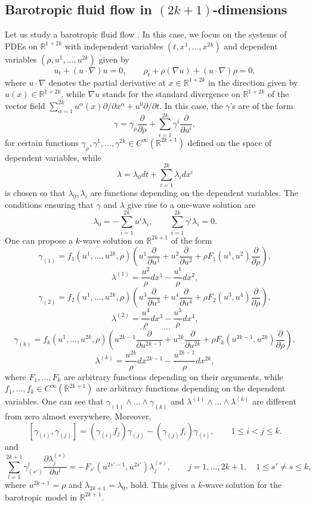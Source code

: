 \documentclass[12pt]{article}
\theoremstyle{plain}
\theoremstyle{definition}
\numberwithin{equation}{section}
\begin{document}
\subsection{Barotropic fluid flow in $(2k+1)$-dimensions}
Let us study a barotropic fluid flow \cite{Gr23,Mi58}. In this case, we focus on the systems of PDEs on $\mathbb{R}^{1+2k}$ with independent variables $(t,x^1,\ldots,x^{2k})$ and dependent variables $(\rho,u^1,\ldots,u^{2k})$ given by
$$
u_t+(u\cdot\nabla)u=0,\qquad \rho_t+\rho(\nabla u)+(u\cdot \nabla) \rho=0,
$$
where $u\cdot \nabla$ denotes the partial derivative at $x\in \mathbb{R}^{1+2k}$ in the direction given by $u(x)\in \mathbb{R}^{1+2k}$, while $\nabla u$ stands for the standard divergence on $\mathbb{R}^{1+2k}$ of the vector field $\sum_{\alpha=1}^{2k}u^\alpha(x)\partial/\partial x^\alpha+u^0\partial/\partial t$.
In this case, the $\gamma$'s are of the form
$$
\gamma=\gamma_\rho\frac{\partial}{\partial \rho}+\sum_{i=1}^{2k}\gamma^i\frac{\partial}{\partial u^i},
$$
for certain functions $\gamma_\rho,\gamma^1,\ldots,\gamma^{2k}\in C^\infty(\mathbb{R}^{2k+1})$ defined on the space of dependent variables,
while
$$
\lambda=\lambda_0dt+\sum_{i=1}^{2k}\lambda_idx^i
$$
is chosen so that $\lambda_0,\lambda_i$ are functions depending on the dependent variables. 
The conditions ensuring that $\gamma$ and $\lambda$ give rise to a one-wave solution are
$$
\lambda_0=-\sum_{i=1}^{2k}u^i\lambda_i,\qquad \sum_{i=1}^{2k}\gamma^i\lambda_i=0.
$$
One can propose a $k$-wave solution on $\mathbb{R}^{2k+1}$ of the form
$$
\gamma_{(1)}=f_1(u^1,\ldots,u^{2k},\rho) \left(u^1\frac{\partial}{\partial u^1}+u^2\frac{\partial}{\partial u^2}+\rho F_1(u^1,u^2)\frac{\partial}{\partial \rho}\right),
$$
$$
\lambda^{(1)}=\frac{u^2}{\rho}dx^1-\frac{u^1}{\rho}dx^2,
$$
$$
\gamma_{(2)}=f_2(u^1,\ldots,u^{2k},\rho) \left(u^3\frac{\partial}{\partial u^3}+u^4\frac{\partial}{\partial u^4}+\rho F_2(u^3,u^4)\frac{\partial}{\partial \rho}\right),
$$
$$
\lambda^{(2)}=\frac{u^4}{\rho}dx^3-\frac{u^3}{\rho}dx^4,
$$
$$
\ldots\qquad \ldots
$$
$$
\gamma_{(k)}=f_k(u^1,\ldots,u^{2k},\rho) \left(u^{2k-1}\frac{\partial}{\partial u^{2k-1}}+u^{2k}\frac{\partial}{\partial u^{2k}}+\rho F_k(u^{2k-1},u^{2k})\frac{\partial}{\partial \rho}\right),$$
$$
\lambda^{(k)}=\frac{u^{2k}}{\rho}dx^{2k-1}-\frac{u^{2k-1}}{\rho}dx^{2k},
$$
where $F_1,\ldots,F_k$ are arbitrary functions depending on their arguments, while $f_1,\ldots,f_k\in C^\infty(\mathbb{R}^{2k+1})$ are arbitrary functions depending on the dependent variables. One can see that $\gamma_{(1)}\wedge \ldots\wedge \gamma_{(k)}$ and $\lambda^{(1)}\wedge \ldots\wedge \lambda^{(k)}$ are different from zero almost everywhere. Moreover,
$$
[\gamma_{(i)},\gamma_{(j)}]=(\gamma_{(i)}f_j)\gamma_{(j)}-(\gamma_{(j)}f_i)\gamma_{(i)},\qquad 1\leq i<j\leq k.
$$
and 
$$
\sum_{l=1}^{2k+1}\gamma_{(s')}^l\frac{\partial \lambda^{(s)}_j}{\partial u^l}=-F_{s'}(u^{2s'-1},u^{2s'})\lambda^{(s)}_j,\qquad j=1,\ldots,2k+1,\quad 1\leq s'\neq s\leq k,
$$
where $u^{2k+1}=\rho$ and $\lambda_{2k+1}=\lambda_0$, hold. This gives a $k$-wave solution for the barotropic model in $\mathbb{R}^{2k+1}$. 
\end{document}
